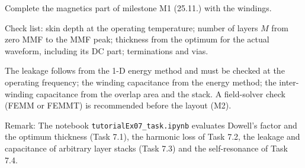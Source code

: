 

Complete the magnetics part of milestone M1 (25.11.) with the windings.


\begin{solutionblock}
	Check list: skin depth at the operating temperature; number of layers $M$ from zero MMF to the MMF peak; thickness from the optimum for the actual waveform, including its DC part; terminations and vias.
\end{solutionblock}


\begin{solutionblock}
	The leakage follows from the 1-D energy method and must be checked at the operating frequency; the winding capacitance from the energy method; the inter-winding capacitance from the overlap area and the stack. A field-solver check (FEMM or FEMMT) is recommended before the layout (M2).
\end{solutionblock}

\vspace{0.5cm}
Remark: The notebook \texttt{tutorialEx07\_task.ipynb} evaluates Dowell's factor and the optimum thickness (Task 7.1), the harmonic loss of Task 7.2, the leakage and capacitance of arbitrary layer stacks (Task 7.3) and the self-resonance of Task 7.4.
